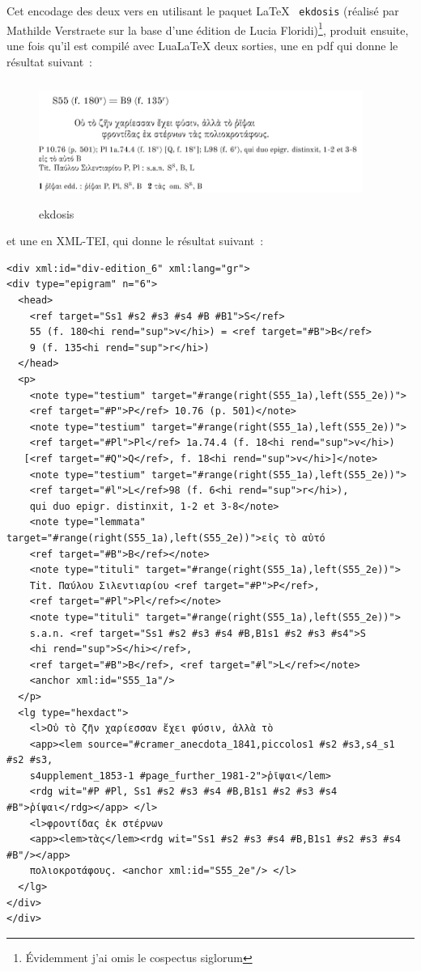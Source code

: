\normalsize

Cet encodage des deux vers en utilisant le paquet \LaTeX~
\texttt{ekdosis} (réalisé par Mathilde Verstraete sur la base d'une
édition de Lucia Floridi)\footnote{Évidemment j'ai omis le cospectus
  siglorum}, produit ensuite, une fois qu'il est compilé avec LuaLaTeX
deux sorties, une en pdf qui donne le résultat suivant~:

\begin{figure}
\centering
\includegraphics[width=4.16667in,height=1.5625in]{s55ekdosis.png}
\caption{ekdosis}
\end{figure}

et une en XML-TEI, qui donne le résultat suivant~:

\scriptsize
\begin{verbatim}
<div xml:id="div-edition_6" xml:lang="gr">
<div type="epigram" n="6">
  <head>
    <ref target="Ss1 #s2 #s3 #s4 #B #B1">S</ref>
    55 (f. 180<hi rend="sup">v</hi>) = <ref target="#B">B</ref>
    9 (f. 135<hi rend="sup">r</hi>)
  </head>
  <p>
    <note type="testium" target="#range(right(S55_1a),left(S55_2e))">
    <ref target="#P">P</ref> 10.76 (p. 501)</note>
    <note type="testium" target="#range(right(S55_1a),left(S55_2e))">
    <ref target="#Pl">Pl</ref> 1a.74.4 (f. 18<hi rend="sup">v</hi>) 
   [<ref target="#Q">Q</ref>, f. 18<hi rend="sup">v</hi>]</note>
    <note type="testium" target="#range(right(S55_1a),left(S55_2e))">
    <ref target="#l">L</ref>98 (f. 6<hi rend="sup">r</hi>), 
    qui duo epigr. distinxit, 1-2 et 3-8</note>
    <note type="lemmata" target="#range(right(S55_1a),left(S55_2e))">εἰς τὸ αὐτό 
    <ref target="#B">B</ref></note>
    <note type="tituli" target="#range(right(S55_1a),left(S55_2e))">
    Tit. Παύλου Σιλεντιαρίου <ref target="#P">P</ref>, 
    <ref target="#Pl">Pl</ref></note>
    <note type="tituli" target="#range(right(S55_1a),left(S55_2e))">
    s.a.n. <ref target="Ss1 #s2 #s3 #s4 #B,B1s1 #s2 #s3 #s4">S
    <hi rend="sup">S</hi></ref>, 
    <ref target="#B">B</ref>, <ref target="#l">L</ref></note>
    <anchor xml:id="S55_1a"/>
  </p>
  <lg type="hexdact">
    <l>Οὐ τὸ ζῆν χαρίεσσαν ἔχει φύσιν, ἀλλὰ τὸ 
    <app><lem source="#cramer_anecdota_1841,piccolos1 #s2 #s3,s4_s1 #s2 #s3,
    s4upplement_1853-1 #page_further_1981-2">ῥῖψαι</lem>
    <rdg wit="#P #Pl, Ss1 #s2 #s3 #s4 #B,B1s1 #s2 #s3 #s4 #B">ῥίψαι</rdg></app> </l>
    <l>φροντίδας ἐκ στέρνων 
    <app><lem>τὰς</lem><rdg wit="Ss1 #s2 #s3 #s4 #B,B1s1 #s2 #s3 #s4 #B"/></app> 
    πολιοκροτάφους. <anchor xml:id="S55_2e"/> </l>
  </lg>
</div>
</div>

\end{verbatim}
\normalsize

